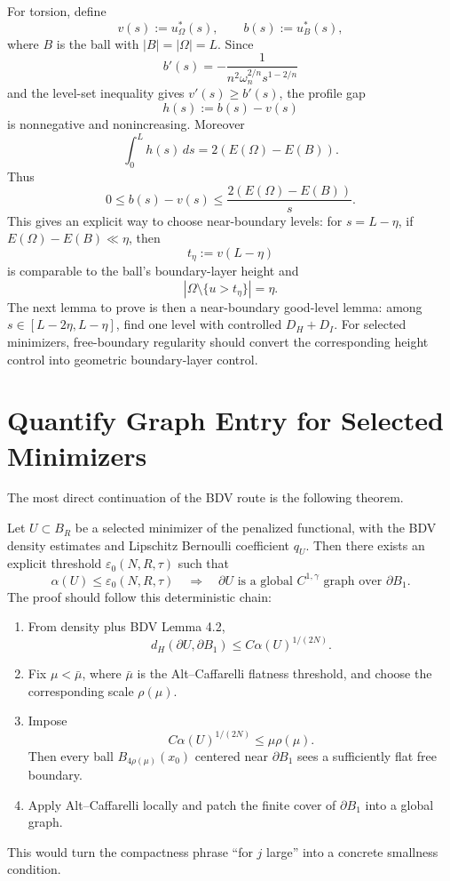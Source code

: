 \documentclass[11pt]{article}
\begin{document}
For torsion, define
\[
v(s):=u_\Omega^*(s),\qquad b(s):=u_B^*(s),
\]
where \(B\) is the ball with \(|B|=|\Omega|=L\). Since
\[
b'(s)=-\frac{1}{n^2\omega_n^{2/n}s^{1-2/n}}
\]
and the level-set inequality gives \(v'(s)\ge b'(s)\), the profile gap
\[
h(s):=b(s)-v(s)
\]
is nonnegative and nonincreasing. Moreover
\[
\int_0^L h(s)\,ds=2(E(\Omega)-E(B)).
\]
Thus
\[
0\le b(s)-v(s)\le \frac{2(E(\Omega)-E(B))}{s}.
\]
This gives an explicit way to choose near-boundary levels: for \(s=L-\eta\),
if \(E(\Omega)-E(B)\ll\eta\), then
\[
t_\eta:=v(L-\eta)
\]
is comparable to the ball's boundary-layer height and
\[
|\Omega\setminus\{u>t_\eta\}|=\eta.
\]
The next lemma to prove is then a near-boundary good-level lemma: among
\(s\in[L-2\eta,L-\eta]\), find one level with controlled \(D_H+D_I\). For
selected minimizers, free-boundary regularity should convert the corresponding
height control into geometric boundary-layer control.

\section{Quantify Graph Entry for Selected Minimizers}

The most direct continuation of the BDV route is the following theorem.

Let \(U\subset B_R\) be a selected minimizer of the penalized functional, with
the BDV density estimates and Lipschitz Bernoulli coefficient \(q_U\). Then
there exists an explicit threshold \(\varepsilon_0(N,R,\tau)\) such that
\[
\alpha(U)\le \varepsilon_0(N,R,\tau)
\quad\Longrightarrow\quad
\partial U
\text{ is a global }C^{1,\gamma}\text{ graph over }\partial B_1.
\]
The proof should follow this deterministic chain:
\begin{enumerate}
\item From density plus BDV Lemma 4.2,
\[
d_H(\partial U,\partial B_1)\le C\alpha(U)^{1/(2N)}.
\]
\item Fix \(\mu<\bar\mu\), where \(\bar\mu\) is the Alt--Caffarelli flatness
threshold, and choose the corresponding scale \(\rho(\mu)\).
\item Impose
\[
C\alpha(U)^{1/(2N)}\le \mu\rho(\mu).
\]
Then every ball \(B_{4\rho(\mu)}(x_0)\) centered near \(\partial B_1\) sees a
sufficiently flat free boundary.
\item Apply Alt--Caffarelli locally and patch the finite cover of \(\partial B_1\)
into a global graph.
\end{enumerate}
This would turn the compactness phrase ``for \(j\) large'' into a concrete
smallness condition.
\end{document}
